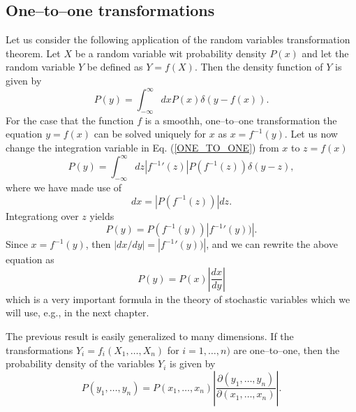 \subsection{One--to--one transformations}
Let us consider the following application of the random variables
transformation theorem. Let $X$ be a random variable wit 
probability density $P(x)$ and let the random variable $Y$ be 
defined as $Y=f(X)$. Then the density function of $Y$ is given by
\begin{equation*}\label{ONE_TO_ONE}
P(y) = \int_{-\infty}^{\infty} dx P(x) \delta(y-f(x)).
\end{equation*}
For the case that the function $f$ is a smoothh, one--to--one
transformation the equation $y=f(x)$ can be solved uniquely for $x$
as $x=f^{-1}(y)$. Let us now change the integration variable in 
Eq. (\ref{ONE_TO_ONE}) from $x$ to $z=f(x)$
\begin{equation*}
P(y) = \int_{-\infty}^{\infty} dz \left| {f^{-1}}'(z) \right|
      P(f^{-1}(z)) \delta(y-z),
\end{equation*}
where we have made use of
\begin{equation*}
dx = \left| P(f^{-1}(z)) \right| dz.
\end{equation*}
Integrationg over $z$ yields
\begin{equation*}
P(y) = P(f^{-1}(y)) \left|{f^{-1}}'(y)) \right|.
\end{equation*}
Since $x=f^{-1}(y)$, then $|dx/dy|=|{f^{-1}}'(y))|$, and we can 
rewrite the above equation as
\begin{equation*}
P(y) = P(x) \left|  \frac{dx}{dy} \right|
\end{equation*}
which is a very important formula in the theory of stochastic 
variables which we will use, e.g., in the next chapter.

The previous result is easily generalized to many dimensions.
If the transformations $Y_i =f_i(X_1, \ldots, X_n)$ for $i=1,\ldots,n)$ are 
one--to--one, then the probability density of the variables $Y_i$ 
is given by
\begin{equation*}
P(y_1, \ldots, y_n) = P(x_1, \ldots, x_n) 
     \left|  \frac{\partial(y_1, \ldots, y_n)}
     {\partial(x_1, \ldots, x_n)} \right|.
\end{equation*}

